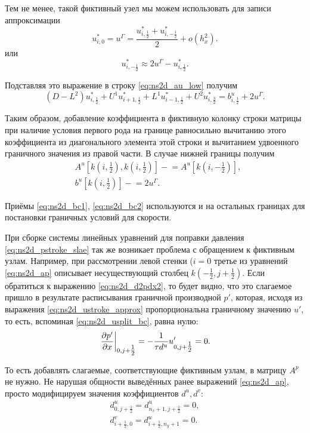 Тем не менее, такой фиктивный узел мы можем 
использовать для записи аппроксимации
\begin{equation*}
    u^*_{i,0} = u^\Gamma = \frac{u^*_{i,\tfrac12} + u^*_{i, -\tfrac12}}{2} + o(h_x^2).
\end{equation*}
или
\begin{equation*}
    u^*_{i, -\tfrac12} \approx 2u^\Gamma - u^*_{i,\tfrac12}.
\end{equation*}

Подставляя это выражение в строку \eqref{eq:ns2d_au_low} получим
\begin{equation*}
      (D - L^2) u^*_{i, \tfrac12}
    + U^1       u^*_{i+1, \tfrac12}
    + L^1       u^*_{i-1, \tfrac12}
    + U^2       u^*_{i, \tfrac32}
    = b^u_{i, \tfrac12} + 2 u^\Gamma.
\end{equation*}

Таким образом, добавление коэффициента в фиктивную колонку строки матрицы при
наличие условия первого рода на границе равносильно
вычитанию этого коэффициента из диагонального элемента этой строки
и вычитанием удвоенного граничного значения из правой части.
В случае нижней границы получим
\begin{align}
    \label{eq:ns2d_bc2}
    &A^u[k(i, \tfrac12), k(i, \tfrac12)] \mathrel{-}= A^u[k(i, -\tfrac12)], \\[10pt]
    \nonumber
    &b^u[k(i, \tfrac12)] \mathrel{-}= 2 u^\Gamma.
\end{align}

Приёмы \eqref{eq:ns2d_bc1}, \eqref{eq:ns2d_bc2}
используются и на остальных границах для
постановки граничных условий для скорости.

При сборке системы линейных уравнений для
поправки давления \eqref{eq:ns2d_pstroke_slae}
так же возникает проблема с обращением
к фиктивным узлам. Например, при рассмотрении левой стенки ($i=0$
третье из уравнений \eqref{eq:ns2d_ap} описывает
несуществующий столбец $k(-\tfrac12, j+\tfrac12)$.
Если обратиться к выражению \eqref{eq:ns2d_d2pdx2},
то будет видно, что это слагаемое пришло в результате
расписывания граничной производной $p'$,
которая, исходя из выражения \eqref{eq:ns2d_ustroke_approx} пропорциональна граничному значению $u'$,
то есть, вспоминая \eqref{eq:ns2d_usplit_bc}, равна нулю:
\begin{equation*}
\left. \frac{\partial p'}{\partial x} \right|_{0,j+\tfrac12} = -\frac{1}{\tau d^u} u'_{0,j+\tfrac12} = 0.
\end{equation*}

То есть добавлять слагаемые, соответствующие фиктивным узлам, в матрицу $A^p$ не нужно.
Не нарушая общности выведённых ранее выражений \eqref{eq:ns2d_ap},
просто модифицируем значения коэффициентов $d^u, d^v$:
\begin{align}
    \label{eq:ns2d_bc3}
    d^u_{0, j+\tfrac12} = d^u_{n_x+1, j+\tfrac12} = 0, \\[10pt]
    \nonumber
    d^v_{i+\tfrac12, 0} = d^u_{i+\tfrac12, n_y+1} = 0.
\end{align}

